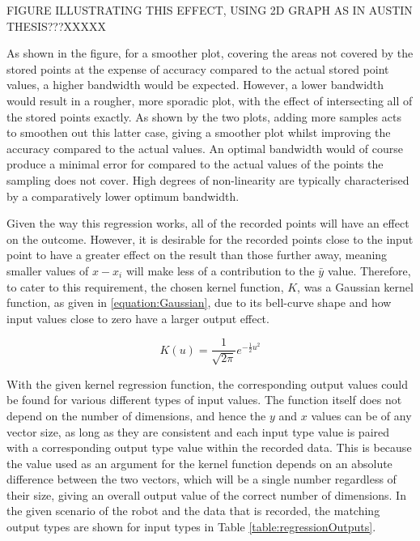 \documentclass[11pt]{article}
\begin{document}
FIGURE ILLUSTRATING THIS EFFECT, USING 2D GRAPH AS IN AUSTIN THESIS???XXXXX

As shown in the figure, for a smoother plot, covering the areas not covered by the stored points at the expense of accuracy compared to the actual stored point values, a higher bandwidth would be expected. However, a lower bandwidth would result in a rougher, more sporadic plot, with the effect of intersecting all of the stored points exactly. As shown by the two plots, adding more samples acts to smoothen out this latter case, giving a smoother plot whilst improving the accuracy compared to the actual values. An optimal bandwidth would of course produce a minimal error for compared to the actual values of the points the sampling does not cover. High degrees of non-linearity are typically characterised by a comparatively lower optimum bandwidth.

Given the way this regression works, all of the recorded points will have an effect on the outcome. However, it is desirable for the recorded points close to the input point to have a greater effect on the result than those further away, meaning smaller values of $x - x_{i}$ will make less of a contribution to the $\bar{y}$ value. Therefore, to cater to this requirement, the chosen kernel function, $K$, was a Gaussian kernel function, as given in \eqref{equation:Gaussian}, due to its bell-curve shape and how input values close to zero have a larger output effect.

\begin{equation}\label{equation:Gaussian}
K(u) = \frac{1}{\sqrt{2\pi}}e^{-\frac{1}{2}u^2}
\end{equation}

With the given kernel regression function, the corresponding output values could be found for various different types of input values. The function itself does not depend on the number of dimensions, and hence the $y$ and $x$ values can be of any vector size, as long as they are consistent and each input type value is paired with a corresponding output type value within the recorded data. This is because the value used as an argument for the kernel function depends on an absolute difference between the two vectors, which will be a single number regardless of their size, giving an overall output value of the correct number of dimensions. In the given scenario of the robot and the data that is recorded, the matching output types are shown for input types in Table \ref{table:regressionOutputs}.
\end{document}
